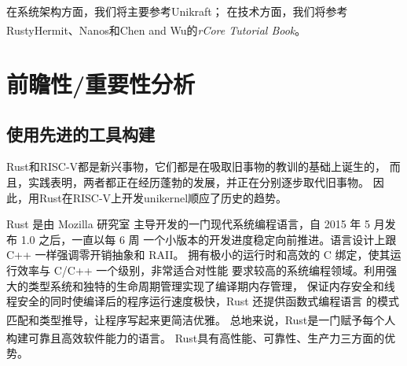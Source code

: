\documentclass[UTF8,fontset=none,linespread=1.15]{ctexart}
\let\nosupcite\cite
\renewcommand*{\cite}[1]{\textsuperscript{\nosupcite{#1}}}
\begin{document}
在系统架构方面，我们将主要参考Unikraft；
在技术方面，我们将参考RustyHermit、Nanos和Chen and Wu的\textit{rCore Tutorial Book}\cite{bib:rcore-os}。

\section{前瞻性/重要性分析}

\subsection{使用先进的工具构建}

Rust和RISC-V都是新兴事物，它们都是在吸取旧事物的教训的基础上诞生的，
而且，实践表明，两者都正在经历蓬勃的发展，并正在分别逐步取代旧事物。
因此，用Rust在RISC-V上开发unikernel顺应了历史的趋势。

Rust 是由 Mozilla 研究室
主导开发的一门现代系统编程语言，自 2015 年 5 月发布 1.0 之后，一直以每 6 周
一个小版本的开发进度稳定向前推进。语言设计上跟 C++ 一样强调零开销抽象和 RAII。
拥有极小的运行时和高效的 C 绑定，使其运行效率与 C/C++ 一个级别，非常适合对性能
要求较高的系统编程领域。利用强大的类型系统和独特的生命周期管理实现了编译期内存管理，
保证内存安全和线程安全的同时使编译后的程序运行速度极快，Rust 还提供函数式编程语言
的模式匹配和类型推导，让程序写起来更简洁优雅。\cite{bib:2-why-rust}
总地来说，Rust是一门赋予每个人 构建可靠且高效软件能力的语言。\cite{bib:1-rust-lang}
Rust具有高性能、可靠性、生产力三方面的优势。
\end{document}
